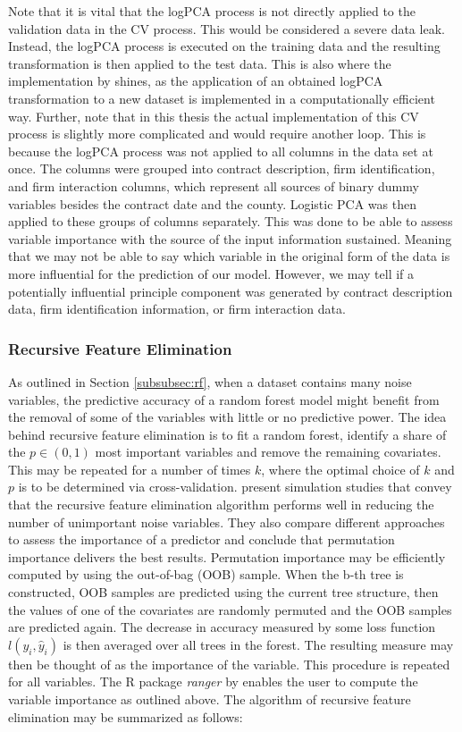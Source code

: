 \documentclass[a4paper,12pt, headsepline]{scrartcl}
\numberwithin{equation}{section}
\begin{document}
Note that it is vital that the logPCA process is not directly applied to the validation data in the CV process. This would be considered a severe data leak. Instead, the logPCA process is executed on the training data and the resulting transformation is then applied to the test data. This is also where the implementation by \citet{logPCA} shines, as the application of an obtained logPCA transformation to a new dataset is implemented in a computationally efficient way. Further, note that in this thesis the actual implementation of this CV process is slightly more complicated and would require another loop. This is because the logPCA process was not applied to all columns in the data set at once. The columns were grouped into contract description, firm identification, and firm interaction columns, which represent all sources of binary dummy variables besides the contract date and the county. Logistic PCA was then applied to these groups of columns separately. This was done to be able to assess variable importance with the source of the input information sustained. Meaning that we may not be able to say which variable in the original form of the data is more influential for the prediction of our model. However, we may tell if a potentially influential principle component was generated by contract description data, firm identification information, or firm interaction data.

\subsubsection{Recursive Feature Elimination}\label{subsubsec:rfe}
As outlined in Section \ref{subsubsec:rf}, when a dataset contains many noise variables, the predictive accuracy of a random forest model might benefit from the removal of some of the variables with little or no predictive power. The idea behind recursive feature elimination is to fit a random forest, identify a share of the $p \in (0, 1)$ most important variables and remove the remaining covariates. This may be repeated for a number of times $k$, where the optimal choice of $k$ and $p$ is to be determined via cross-validation. \citet{gregorutti13} present simulation studies that convey that the recursive feature elimination algorithm performs well in reducing the number of unimportant noise variables. They also compare different approaches to assess the importance of a predictor and conclude that permutation importance delivers the best results. Permutation importance may be efficiently computed by using the out-of-bag (OOB) sample. When the b-th tree is constructed, OOB samples are predicted using the current tree structure, then the values of one of the covariates are randomly permuted and the OOB samples are predicted again. The decrease in accuracy measured by some loss function $l(y_i, \hat y_i)$ is then averaged over all trees in the forest. The resulting measure may then be thought of as the importance of the variable. This procedure is repeated for all variables. The R package \textit{ranger} by \citet{ranger} enables the user to compute the variable importance as outlined above. The algorithm of recursive feature elimination may be summarized as follows:
\end{document}
